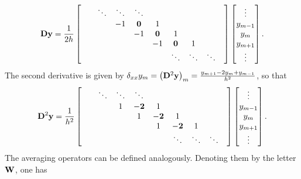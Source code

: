 \documentclass[11pt,twoside,a4paper,english]{book}
\newcommand{\dss}{\delta_{xx}}
\begin{document}
\begin{equation}
{\bf D} {\bf y} = \frac{1}{2 h}\begin{bmatrix}
& & \ddots  & \ddots & \ddots & & & &\\ 
& & & -1 & {\bf 0} & 1 & & & &\\
& & & & -1 & {\bf 0 } & 1 &  & &\\
& & & & & -1 & {\bf 0 } & 1 &  & \\
& & & & & & \ddots & \ddots &  \ddots & \\
\end{bmatrix}
\begin{bmatrix}
\vdots \\
y_{m-1}\\
y_{m}\\
y_{m+1} \\
\vdots
\end{bmatrix}.
\end{equation}
The second derivative is given by $\dss y_m = \left({\bf D}^2 {\bf y}\right)_m = \frac{y_{m+1} -2y_{m} + y_{m-1}}{h^2}$, so that
\begin{equation}
{\bf D}^2 {\bf y} = \frac{1}{h^2}\begin{bmatrix}
& & \ddots  & \ddots & \ddots & & & &\\ 
& & & 1 & {\bf -2} & 1 & & & &\\
& & & & 1 & {\bf -2 } & 1 &  & &\\
& & & & & 1 & {\bf -2 } & 1 &  & \\
& & & & & & \ddots & \ddots &  \ddots & \\
\end{bmatrix}
\begin{bmatrix}
\vdots \\
y_{m-1}\\
y_{m}\\
y_{m+1} \\
\vdots
\end{bmatrix}.
\end{equation}
The averaging operators can be defined analogously. Denoting them by the letter ${\bf W}$, one has
\end{document}
